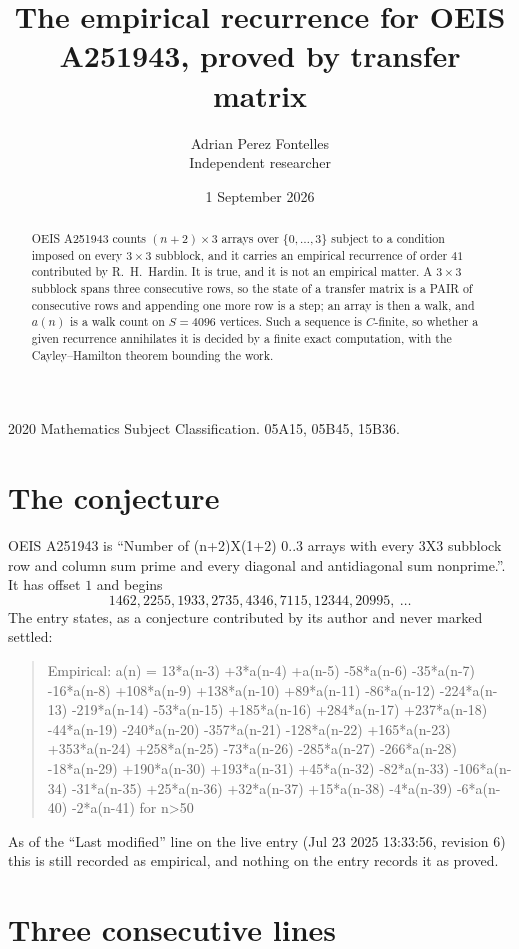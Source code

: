 \documentclass[11pt,a4paper]{article}
\title{The empirical recurrence for OEIS A251943, proved by transfer matrix}
\author{Adrian Perez Fontelles\\ \small Independent researcher}
\date{1 September 2026}
\theoremstyle{plain}
\theoremstyle{definition}
\begin{document}
\maketitle

\begin{abstract}
OEIS A251943 counts $(n+2)\times3$ arrays over $\{0,\dots,3\}$ subject to a condition imposed on
every $3\times3$ subblock, and it carries an empirical recurrence of order $41$
contributed by R.~H.~Hardin. It is true, and it is not an empirical matter. A $3\times3$
subblock spans three consecutive rows, so the state of a transfer matrix is a PAIR of
consecutive rows and appending one more row is a step; an array is then a walk, and
$a(n)$ is a walk count on $S=4096$ vertices. Such a sequence is $C$-finite, so whether a given
recurrence annihilates it is decided by a finite exact computation, with the Cayley--Hamilton
theorem bounding the work.
\end{abstract}

\noindent\small 2020 Mathematics Subject Classification. 05A15, 05B45, 15B36.\normalsize

\section{The conjecture}

OEIS A251943 is ``Number of (n+2)X(1+2) 0..3 arrays with every 3X3 subblock row and column sum prime and every diagonal and antidiagonal sum nonprime.''. It has offset $1$ and begins
\[
1462, 2255, 1933, 2735, 4346, 7115, 12344, 20995,\ \dots
\]
The entry states, as a conjecture contributed by its author and never marked settled:
\begin{quote}
Empirical: a(n) = 13*a(n-3) +3*a(n-4) +a(n-5) -58*a(n-6) -35*a(n-7) -16*a(n-8) +108*a(n-9) +138*a(n-10) +89*a(n-11) -86*a(n-12) -224*a(n-13) -219*a(n-14) -53*a(n-15) +185*a(n-16) +284*a(n-17) +237*a(n-18) -44*a(n-19) -240*a(n-20) -357*a(n-21) -128*a(n-22) +165*a(n-23) +353*a(n-24) +258*a(n-25) -73*a(n-26) -285*a(n-27) -266*a(n-28) -18*a(n-29) +190*a(n-30) +193*a(n-31) +45*a(n-32) -82*a(n-33) -106*a(n-34) -31*a(n-35) +25*a(n-36) +32*a(n-37) +15*a(n-38) -4*a(n-39) -6*a(n-40) -2*a(n-41) for n>50
\end{quote}
As of the ``Last modified'' line on the live entry (Jul 23 2025 13:33:56, revision 6) this is still
recorded as empirical, and nothing on the entry records it as proved.

\section{Three consecutive lines}
\end{document}

